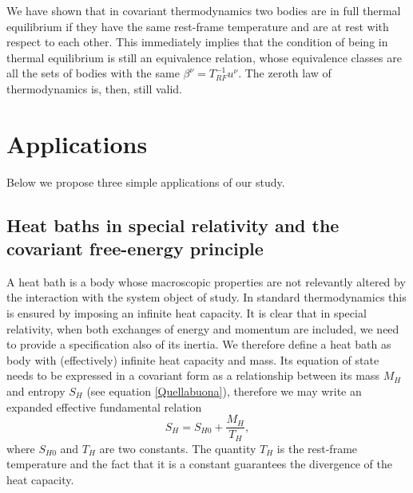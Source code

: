 \documentclass[twocolumn,usenatbib]{mnras2}
\begin{document}
We have shown that in covariant thermodynamics two bodies are in full thermal equilibrium if they have the same rest-frame temperature and are at rest with respect to each other. This immediately implies that the condition of being in thermal equilibrium is still an equivalence relation, whose equivalence classes are all the sets of bodies with the same $\beta^\nu=T_{RF}^{-1} u^\nu$. The zeroth law of thermodynamics is, then, still valid.



\section{Applications}

Below we propose three simple applications of our study. 



\subsection{Heat baths in special relativity and the covariant free-energy principle}

A heat bath is a body whose macroscopic properties are not relevantly altered by the interaction with the system object of study. In standard thermodynamics this is ensured by imposing an infinite heat capacity. It is clear that in special relativity, when both exchanges of energy and momentum are included, we need to provide a specification also of its inertia. We therefore define a heat bath as body with (effectively) infinite heat capacity and mass. Its equation of state needs to be expressed in a covariant form as a relationship between its mass $M_H$ and entropy $S_H$ (see equation \eqref{Quellabuona}), therefore we may write an expanded effective fundamental relation 
\begin{equation}\label{Bagnooo}
S_H =S_{H0} + \dfrac{M_H}{T_H} ,
\end{equation}
where $S_{H0}$ and $T_H$ are two constants. The quantity $T_H$ is the rest-frame temperature and the fact that it is a constant guarantees the divergence of the heat capacity.  
\end{document}
